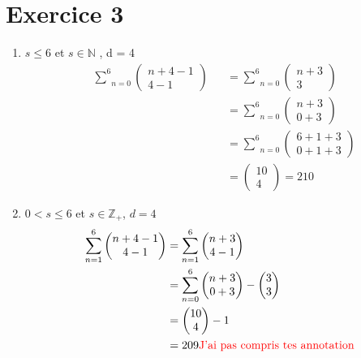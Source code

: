 \documentclass[fontsize=10pt]{article}
\begin{document}
\section*{Exercice 3}
\begin{enumerate}
\item $s \leq 6 $ et $s \in \mathbb{N}$ \hspace{0.5cm}, \hspace{0.5cm} d = 4
\begin{align*}
&\underset{n=0}{\overset{6}{\sum}}\begin{pmatrix}
n + 4 -1\\
4-1
\end{pmatrix} &&=
\underset{n=0}{\overset{6}{\sum}}\begin{pmatrix}
n + 3\\
3
\end{pmatrix}\\
&&&=
\underset{n=0}{\overset{6}{\sum}}\begin{pmatrix}
n + 3\\
0+3
\end{pmatrix}\\
&&&=\underset{n=0}{\overset{6}{\sum}}\begin{pmatrix}
6+1+3\\
0+1+3
\end{pmatrix}\\&&&= \begin{pmatrix} 10 \\ 4\end{pmatrix} = 210
\end{align*}
\item$ 0 < s \leq 6$ et $s \in \mathbb{Z}_+$, $d=4$
\begin{align*}
\underset{n=1}{\overset{6}{\sum}}
\begin{pmatrix}
n+4-1\\
4-1
\end{pmatrix} &=\underset{n=1}{\overset{6}{\sum}}
\begin{pmatrix}
n+3\\
4-1
\end{pmatrix}\\
&=\underset{n=0}{\overset{6}{\sum}}
\begin{pmatrix}
n+3\\
0+3
\end{pmatrix}
-
\begin{pmatrix}
3\\
3
\end{pmatrix}\\
&=
\begin{pmatrix}
10\\
4
\end{pmatrix}-1\\
&=209 \text{\textcolor{red}{ J'ai pas compris tes annotation}}
\end{align*}


\end{enumerate}
\end{document}
